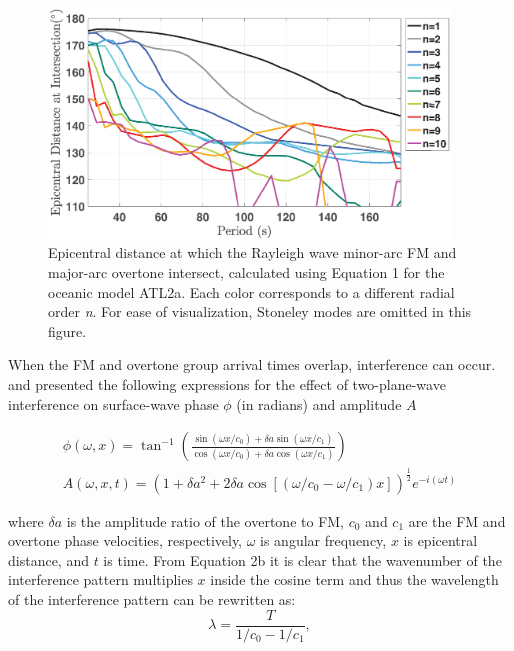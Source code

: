 \documentclass[extra,mreferee]{gji}
\begin{document}
\begin{figure}
\centering
\includegraphics[width=0.95\textwidth]{Fig2_Sver.eps}
\caption{Epicentral distance at which the Rayleigh wave minor-arc FM and major-arc overtone intersect, calculated using Equation 1 for the oceanic model ATL2a. Each color corresponds to a different radial order \textit{n}. For ease of visualization, Stoneley modes are omitted in this figure. }
\end{figure}

When the FM and overtone group arrival times overlap, interference can occur. \citet{forsyth1975new} and \citet{thatcher1969higher} presented the following expressions for the effect of two-plane-wave interference on surface-wave phase $\phi$ (in radians) and amplitude $A$

\begin{subequations} 
\begin{align} 
\phi(\omega, x) = \tan^{-1} \left(\frac{\sin(\omega x/c_0) + \delta a \sin(\omega x/c_1) }{\cos(\omega x/c_0) + \delta a \cos(\omega x/c_1)} \right) \label{eqn: frobenius 7} \\ 
A(\omega, x,t) = (1 + \delta a^2 + 2 \delta a \cos[( \omega/c_0 - \omega/c_1)x])^{\frac{1}{2}} e^{-i ( \omega t)} \label{eqn: frobenius 8} 
\end{align} \end{subequations}


where $\delta a$ is the amplitude ratio of the overtone to FM, $c_0$ and $c_1$ are the FM and overtone phase velocities, respectively, $\omega$ is angular frequency,  $x$ is epicentral distance, and $t$ is time.
From Equation 2b it is clear that the wavenumber of the interference pattern multiplies $x$ inside the cosine term and thus the wavelength of the interference pattern can be rewritten as:
\begin{equation}
\lambda = \frac{T}{1/c_0-1/c_1},
\end{equation}
\end{document}
